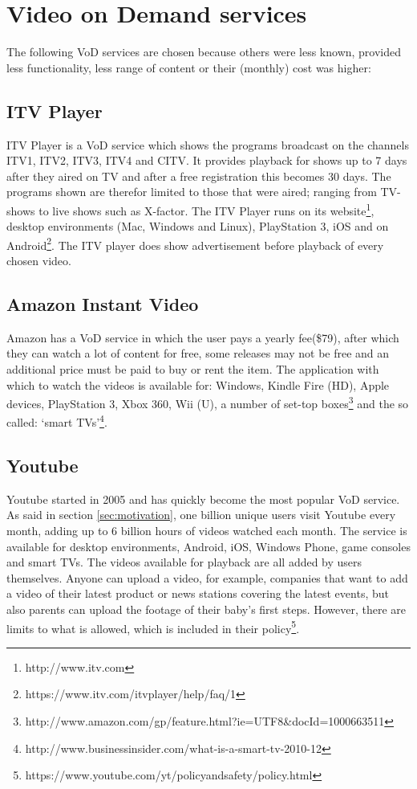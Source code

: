 \section{Video on Demand services}
\label{sec:vodserv}
The following VoD services are chosen because others were less known, provided less functionality, less range of content or their (monthly) cost was higher:

\subsection{ITV Player}
ITV Player is a VoD service which shows the programs broadcast on the channels ITV1, ITV2, ITV3, ITV4 and CITV. It provides playback for shows up to 7 days after they aired on TV and after a free registration this becomes 30 days. The programs shown are therefor limited to those that were aired; ranging from TV-shows to live shows such as X-factor. The ITV Player runs on its website\footnote{http://www.itv.com}, desktop environments (Mac, Windows and Linux), PlayStation 3, iOS and on Android\footnote{https://www.itv.com/itvplayer/help/faq/1}. The ITV player does show advertisement before playback of every chosen video.

\subsection{Amazon Instant Video}
Amazon has a VoD service in which the user pays a yearly fee(\$79), after which they can watch a lot of content for free, some releases may not be free and an additional price must be paid to buy or rent the item. The application with which to watch the videos is available for: Windows, Kindle Fire (HD), Apple devices, PlayStation 3, Xbox 360, Wii (U), a number of set-top boxes\footnote{http://www.amazon.com/gp/feature.html?ie=UTF8\&docId=1000663511} and the so called: `smart TVs'\footnote{http://www.businessinsider.com/what-is-a-smart-tv-2010-12}.

\subsection{Youtube}
Youtube started in 2005 and has quickly become the most popular VoD service. As said in section \ref{sec:motivation}, one billion unique users visit Youtube every month, adding up to 6 billion hours of videos watched each month. The service is available for desktop environments, Android, iOS, Windows Phone, game consoles and smart TVs. The videos available for playback are all added by users themselves. Anyone can upload a video, for example, companies that want to add a video of their latest product or news stations covering the latest events, but also parents can upload the footage of their baby's first steps. However, there are limits to what is allowed, which is included in their policy\footnote{https://www.youtube.com/yt/policyandsafety/policy.html}.

